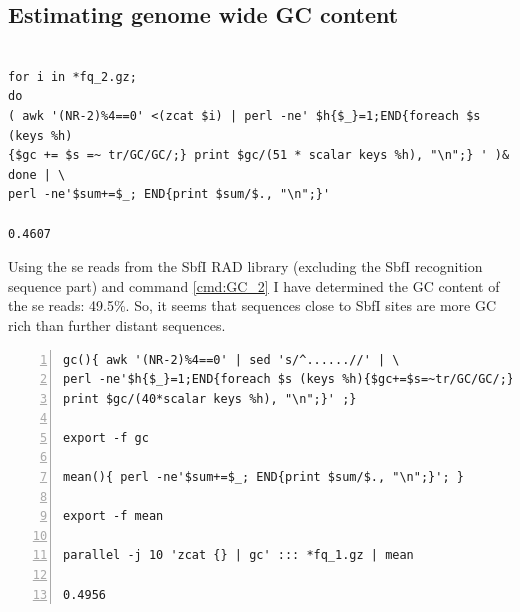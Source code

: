 \documentclass[a4paper,12pt,times,print,index,custombib,custommargin]{PhDThesisPSnPDF}\usepackage[]{graphicx}\usepackage[]{color}
\begin{document}
\subsection{Estimating genome wide GC content}\label{ch:gc}


%
\begin{cmd}
\captionsetup{type=cmd} %
\begin{Verbatim}[formatcom=\color{darkgray}, fontsize=\scriptsize]

for i in *fq_2.gz; 
do 
( awk '(NR-2)%4==0' <(zcat $i) | perl -ne' $h{$_}=1;END{foreach $s (keys %h)
{$gc += $s =~ tr/GC/GC/;} print $gc/(51 * scalar keys %h), "\n";} ' )& 
done | \
perl -ne'$sum+=$_; END{print $sum/$., "\n";}'

0.4607
\end{Verbatim}
\caption[Determine GC content from standard RAD PE reads]{\small For each individual, this command takes the \glspl{pe} reads, uniques them and determines their overall GC content. Finally, the average of the individual GC contents is taken. Note the brute-force parallelisation by sending each iteration of the \texttt{for} loop into the background with \texttt{(\ldots )\&}.}
\label{cmd:GC_1}
\end{cmd}
%
Using the \gls{se} reads from the \gls{SbfI} RAD library (excluding the SbfI recognition sequence part) and command \ref{cmd:GC_2} I have determined the GC content of the \gls{se} reads: 49.5\%. So, it seems that sequences close to \gls{SbfI} sites are more GC rich than further distant sequences. 
%
\begin{cmd}
\captionsetup{type=cmd} %
\begin{Verbatim}[formatcom=\color{darkgray}, fontsize=\scriptsize, numbers=left]
gc(){ awk '(NR-2)%4==0' | sed 's/^......//' | \
perl -ne'$h{$_}=1;END{foreach $s (keys %h){$gc+=$s=~tr/GC/GC/;} 
print $gc/(40*scalar keys %h), "\n";}' ;}

export -f gc

mean(){ perl -ne'$sum+=$_; END{print $sum/$., "\n";}'; }

export -f mean

parallel -j 10 'zcat {} | gc' ::: *fq_1.gz | mean

0.4956
\end{Verbatim}
\caption[Determine GC content of \gls{se} reads]{\small This command is a different version of command \ref{cmd:GC_1}. It is used here to determine the GC content of all \gls{se} reads from the standard \gls{SbfI} RAD library. It first creates and exports two functions, \texttt{gc} and \texttt{mean}, and then uses the programme \texttt{parallel} in order to parallelise the determination of GC content over 10 cores. After stripping barcode and the remainder of the restriction site, the reads are 40 base pairs long. Note, the space between \{ and \texttt{awk} (line 1) as well as \{ and \texttt{perl} (line 7) is required.}
\label{cmd:GC_2}
\end{cmd}
\end{document}
